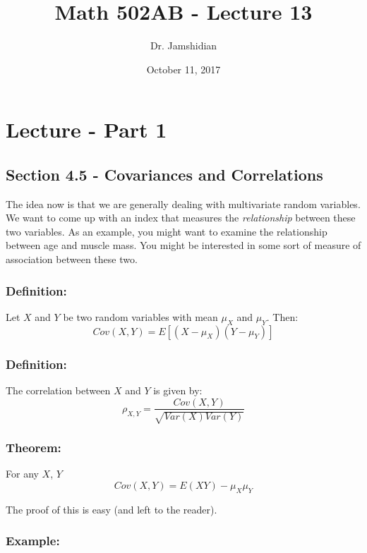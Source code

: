 \documentclass{article}
\title{Math 502AB - Lecture 13}
\author{Dr. Jamshidian}
\date{October 11, 2017}
\begin{document}
\maketitle

\section{Lecture - Part 1}

\subsection{Section 4.5 - Covariances and Correlations}

The idea now is that we are generally dealing with multivariate random variables. We want to come up with an index that measures the \textit{relationship} between these two variables. As an example, you might want to examine the relationship between age and muscle mass. You might be interested in some sort of measure of association between these two.

\subsubsection*{Definition:}

Let $X$ and $Y$ be two random variables with mean $\mu_X$ and $\mu_Y$. Then:
\begin{equation*}
    Cov(X,Y) = E[(X-\mu_X)(Y-\mu_Y)]
\end{equation*}

\subsubsection*{Definition:}
The correlation between $X$ and $Y$ is given by:
\begin{equation*}
    \rho_{X,Y} = \frac{Cov(X,Y)}{\sqrt{Var(X)Var(Y)}}
\end{equation*}

\subsubsection*{Theorem:}
For any $X$, $Y$
\begin{equation*}
    Cov(X,Y) = E(XY) - \mu_X\mu_Y
\end{equation*}

The proof of this is easy (and left to the reader).

\subsubsection*{Example:}
\end{document}
